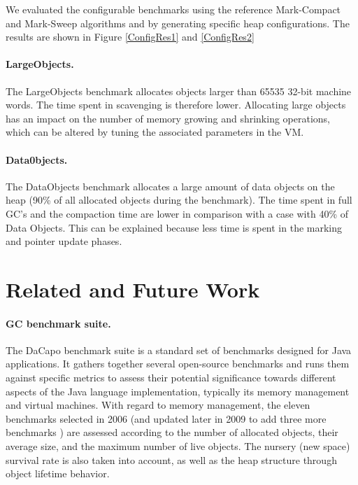 \documentclass[10pt, sigplan]{acmart}
\begin{document}
We evaluated the configurable benchmarks using the reference Mark-Compact and Mark-Sweep algorithms and by generating specific heap configurations. 
The results are shown in Figure \ref{ConfigRes1} and \ref{ConfigRes2}

\paragraph{LargeObjects.} The LargeObjects benchmark allocates objects larger than 65535 32-bit machine words. The time spent in scavenging is therefore lower. Allocating large objects has an impact on the number of memory growing and shrinking operations, which can be altered by tuning the associated parameters in the VM. 
\paragraph{Data0bjects.} The DataObjects benchmark allocates a large amount of data objects on the heap (90\% of all allocated objects during the benchmark). The time spent in full GC's and the compaction time are lower in comparison with a case with 40\% of Data Objects. This can be explained because less time is spent in the marking and pointer update phases.

\section{Related and Future Work}

\paragraph{GC benchmark suite.} The DaCapo benchmark suite \cite{DacapoBench} is a standard set of benchmarks designed for Java applications. It gathers together several open-source benchmarks and runs them against specific metrics to assess their potential significance towards different aspects of the Java language implementation, typically its memory management and virtual machines.
With regard to memory management, the eleven benchmarks selected in 2006 (and updated later in 2009 to add three more benchmarks \cite{DaCapo}) are assessed according to the number of allocated objects, their average size, and the maximum number of live objects. The nursery (new space) survival rate is also taken into account, as well as the heap structure through object lifetime behavior.
\end{document}
